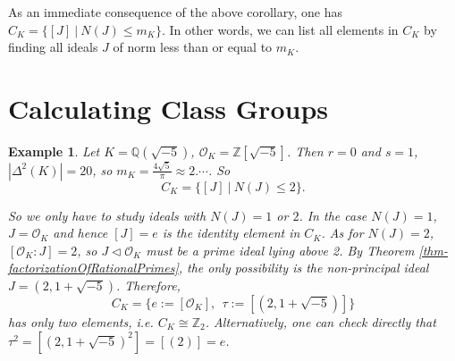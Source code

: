 \documentclass[11pt]{book}
\newtheorem{example}[theorem]{Example}
\begin{document}
As an immediate consequence of the above corollary, one has $C_{K}=\{[J]\ |\ N(J) \leq m_{K}\}$. In other words, we can list all elements in $C_{K}$ by finding all ideals $J$ of norm less than or equal to $m_K$.

\section{Calculating Class Groups}
\begin{example}
    Let $K=\mathbb{Q}(\sqrt{-5})$, $\mathcal{O}_{K}=\mathbb{Z}[\sqrt{-5}]$. Then $r=0$ and $s=1$, $\left| \Delta^{2}(K) \right| =20$, so $m_{K}=\frac{4\sqrt{5}}{\pi} \approx 2.\cdots$. So 
    $$C_{K}=\{[J]\ |\ N(J)\leq 2\}.$$ 

    So we only have to study ideals with $N(J) = 1$ or $2$. In the case $N(J)=1$, $J=\mathcal{O}_{K}$ and hence $[J] = e$ is the identity element in $C_K$. As for $N(J)=2$, $[\mathcal{O}_{K}:J]=2$, so $J\lhd \mathcal{O}_{K}$ must be a prime ideal lying above 2. By Theorem \ref{thm-factorizationOfRationalPrimes}, the only possibility is the non-principal ideal $J=(2,1+\sqrt{-5})$. 
    Therefore, 
    $$C_K = \{e:=[\mathcal{O}_K],\ \  \tau:=[(2,1+\sqrt{-5})]\}$$ 
    has only two elements, i.e. $C_{K}\cong \mathbb{Z}_{2}$. Alternatively, one can check directly that
    $\tau^{2}=[(2,1+ \sqrt{-5})^2] = [(2)] =e$. 
\end{example}
\end{document}
